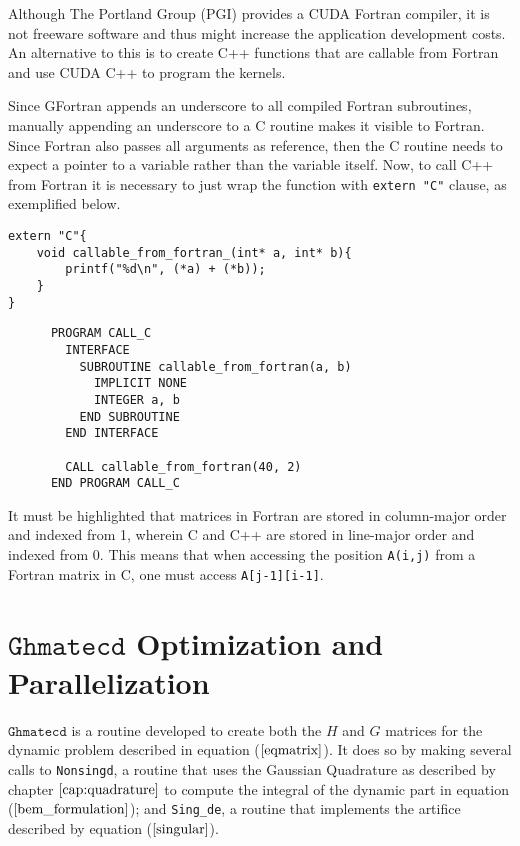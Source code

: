 Although The Portland Group (PGI) provides a CUDA Fortran compiler, it is not freeware software 
and thus might increase the application development costs. An alternative to this is to 
create C++ functions that are callable from Fortran and use CUDA C++ to program the kernels.

Since GFortran appends an underscore to all compiled Fortran subroutines, manually appending an 
underscore to a C routine makes it visible to Fortran. Since Fortran also passes all arguments 
as reference, then the C routine needs to expect a pointer to a variable rather than the variable 
itself. Now, to call C++ from Fortran it is necessary to just wrap the function with \texttt{extern "C"}
clause, as exemplified below.

\begin{minipage}{\textwidth}
\lstset{language=C}
\begin{lstlisting}
extern "C"{
	void callable_from_fortran_(int* a, int* b){
		printf("%d\n", (*a) + (*b));
	}
}
\end{lstlisting}
\lstset{language=Fortran}
\begin{lstlisting}
      PROGRAM CALL_C
        INTERFACE
          SUBROUTINE callable_from_fortran(a, b)
            IMPLICIT NONE
            INTEGER a, b
          END SUBROUTINE
        END INTERFACE

        CALL callable_from_fortran(40, 2)
      END PROGRAM CALL_C
\end{lstlisting}
\end{minipage}
It must be highlighted that matrices in Fortran are stored in column-major order and indexed from 1, 
wherein C and C++ are stored in line-major order and indexed from 0. This means that when accessing 
the position \texttt{A(i,j)} from a Fortran matrix in C, one must access \texttt{A[j-1][i-1]}.

\section{$\texttt{Ghmatecd}$ Optimization and Parallelization}

$\texttt{Ghmatecd}$ is a routine developed to create both the $H$ and $G$ matrices for the dynamic problem 
described in equation ($\ref{eqmatrix}$). It does so by making several calls to \texttt{Nonsingd}, a routine
that uses the Gaussian Quadrature as described by chapter $\ref{cap:quadrature}$ to compute the integral of the 
dynamic part in equation ($\ref{bem_formulation}$); and \texttt{Sing\_de}, a routine 
that implements the artifice described by equation ($\ref{singular}$).

